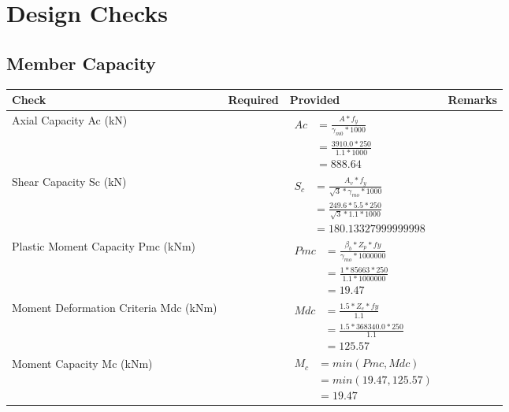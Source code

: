 \documentclass{article}%
\begin{document}
%
%
\newpage%
\section{Design Checks}%
\label{sec:DesignChecks}%
\subsection{Member Capacity}%
\label{subsec:MemberCapacity}%
\renewcommand{\arraystretch}{1.2}%
\begin{longtable}{|p{4cm}|p{5cm}|p{5.5cm}|p{1.5cm}|}%
\hline%
\rowcolor{OsdagGreen}%
Check&Required&Provided&Remarks\\%
\hline%
\endhead%
\hline%
Axial Capacity Ac (kN)&&$\begin{aligned} Ac &=\frac{A*f_y}{\gamma_{m0} *1000}\\ &=\frac{3910.0*250}{1.1* 1000}\\ &=888.64\end{aligned}$&\\%
\hline%
Shear Capacity Sc (kN)&&$\begin{aligned} S_c &= \frac{A_v*f_y}{\sqrt{3}*\gamma_{mo} *1000}\\ &=\frac{249.6*5.5*250}{\sqrt{3}*1.1 *1000}\\ &=180.13327999999998\end{aligned}$&\\%
\hline%
Plastic Moment Capacity Pmc (kNm)&&$\begin{aligned} Pmc &= \frac{\beta_b * Z_p *fy}{\gamma_{mo} * 1000000}\\ &=\frac{1*85663*250}{1.1 * 1000000}\\ &=19.47\end{aligned}$&\\%
\hline%
Moment Deformation Criteria Mdc (kNm)&&$\begin{aligned} Mdc &= \frac{1.5 *Z_e *fy}{1.1}\\ &= \frac{1.5 *368340.0*250}{1.1}\\ &= 125.57\end{aligned}$&\\%
\hline%
Moment Capacity Mc (kNm)&&$\begin{aligned} M_c &= min(Pmc,Mdc)\\ &=min(19.47,125.57)\\ &=19.47\end{aligned}$&\\%
\hline%
\end{longtable}
\end{document}
